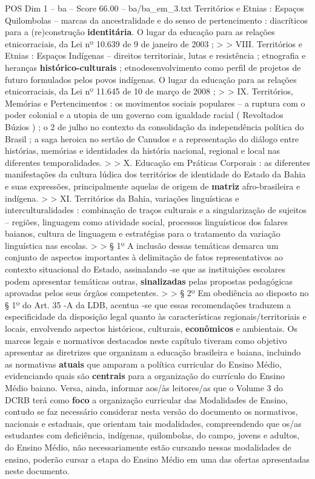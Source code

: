 \begin{textsample}{POS Dim 1 – ba – Score 66.00 – ba/ba\_em\_3.txt}
Territórios e Etnias : Espaços Quilombolas – marcas da ancestralidade e do senso de pertencimento : diacríticos para a (re)construção \textbf{identitária}.
O lugar da educação para as relações etnicorraciais, da Lei nº 10.639 de 9 de janeiro de 2003 ; > > VIII.
Territórios e Etnias : Espaços Indígenas – direitos territoriais, lutas e resistência ; etnografia e heranças \textbf{histórico-culturais} ; etnodesenvolvimento como perfil de projetos de futuro formulados pelos povos indígenas.
O lugar da educação para as relações etnicorraciais, da Lei nº 11.645 de 10 de março de 2008 ; > > IX.
Territórios, Memórias e Pertencimentos : os movimentos sociais populares – a ruptura com o poder colonial e a utopia de um governo com igualdade racial ( Revoltados Búzios ) ; o 2 de julho no contexto da consolidação da independência política do Brasil ; a saga heroica no sertão de Canudos e a representação do diálogo entre histórias, memórias e identidades da história nacional, regional e local nas diferentes temporalidades. > > X.
Educação em Práticas Corporais : as diferentes manifestações da cultura lúdica dos territórios de identidade do Estado da Bahia e suas expressões, principalmente aquelas de origem de \textbf{matriz} afro-brasileira e indígena. > > XI.
Territórios da Bahia, variações linguísticas e interculturalidades : combinação de traços culturais e a singularização de sujeitos – regiões, linguagem como atividade social, processos linguísticos dos falares baianos, cultura de linguagem e estratégias para o tratamento da variação linguística nas escolas. > > § 1º A inclusão dessas temáticas demarca um conjunto de aspectos importantes à delimitação de fatos representativos ao contexto situacional do Estado, assinalando -se que as instituições escolares podem apresentar temáticas outras, \textbf{sinalizadas} pelas propostas pedagógicas aprovadas pelos seus órgãos competentes. > > § 2º Em obediência ao disposto no § 1º do Art. 35 -A da LDB, acentua -se que essas recomendações traduzem a especificidade da disposição legal quanto às características regionais/territoriais e locais, envolvendo aspectos históricos, culturais, \textbf{econômicos} e ambientais.
Os marcos legais e normativos destacados neste capítulo tiveram como objetivo apresentar as diretrizes que organizam a educação brasileira e baiana, incluindo as normativas \textbf{atuais} que amparam a política curricular do Ensino Médio, evidenciando quais são \textbf{centrais} para a organização do currículo do Ensino Médio baiano.
Versa, ainda, informar aos/às leitores/as que o Volume 3 do DCRB terá como \textbf{foco} a organização curricular das Modalidades de Ensino, contudo se faz necessário considerar nesta versão do documento os normativos, nacionais e estaduais, que orientam tais modalidades, compreendendo que os/as estudantes com deficiência, indígenas, quilombolas, do campo, jovens e adultos, do Ensino Médio, não necessariamente estão cursando nessas modalidades de ensino, poderão cursar a etapa do Ensino Médio em uma das ofertas apresentadas neste documento.

\end{textsample}
